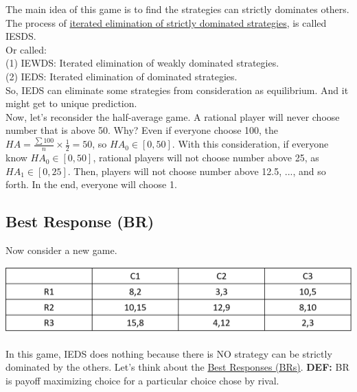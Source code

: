 \documentclass[12pt]{article}
\newcommand{\bb}[1]{{\textbf {#1}}}
\newcommand{\uu}[1]{\underline{#1}}
\newcommand{\e}[1]{$ #1 $}
\begin{document}
\begin{spacing}{1.5}
            The main idea of this game is to find the strategies can strictly dominates others.
            The process of \uu{iterated elimination of strictly dominated strategies}, is called
            IESDS.\\
            Or called:\\
            (1) IEWDS: Iterated elimination of weakly dominated strategies.\\
            (2) IEDS: Iterated elimination of dominated strategies.\\

            So, IEDS can eliminate some strategies from consideration as equilibrium.
            And it might  get to unique prediction.\\

            Now, let's reconsider the half-average game. A rational player will never choose
            number that is above 50. Why? Even if everyone choose 100, the
            \e{HA = \frac{\sum100}{n} \times \frac{1}{2} = 50}, so \e{HA_0 \in [0,50]}.
            With this consideration, if everyone know \e{HA_0 \in [0,50]}, rational players will not
            choose number above 25, as \e{HA_1 \in [0,25]}. Then, players will not choose number above
            12.5, ..., and so forth.
            In the end, everyone will choose 1.

        \subsection{Best Response (BR)}

            Now consider a new game.
            
            \begin{center}
                \includegraphics[scale = .5]{pic/lecture3/best_response_game_initial.png}
            \end{center}

            In this game, IEDS does nothing because there is NO strategy can be strictly
            dominated by the others. Let's think about the \uu{Best Responses (BRs)}.
            \bb{DEF:} BR is payoff maximizing choice for a particular choice chose by rival.\\
            

\end{spacing}
\end{document}
